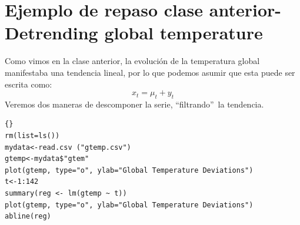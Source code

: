 
\section{Ejemplo de repaso clase anterior-Detrending global temperature}

Como vimos en la clase anterior, la evoluci\'on de la temperatura global manifestaba una tendencia lineal, por lo que podemos asumir que esta puede ser escrita como:
\begin{equation*} 
x_t =\mu_{t} + y_t
\end{equation*}
Veremos dos maneras de descomponer la serie, \textquotedblleft filtrando\textquotedblright \ la tendencia.


\begin{lstlisting}[title={‘Código R: ejemplo 1 Obtención de la componente \textquotedblleft tendencia\textquotedblright de la serie temperatura global(gtemp).’},basicstyle=\ttfamily]{}
rm(list=ls())
mydata<-read.csv ("gtemp.csv")
gtemp<-mydata$"gtem"
plot(gtemp, type="o", ylab="Global Temperature Deviations")
t<-1:142
summary(reg <- lm(gtemp ~ t))
plot(gtemp, type="o", ylab="Global Temperature Deviations")
abline(reg)
\end{lstlisting}

